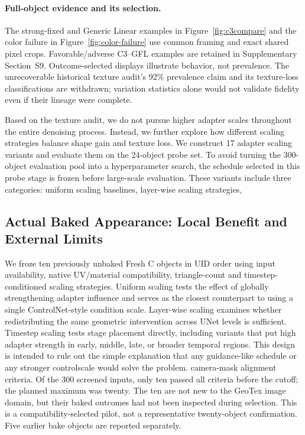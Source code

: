 \documentclass[times,twocolumn,final]{elsarticle}
\providecommand{\DIFadd}[1]{{\protect\color{blue} \sf #1}} %
\providecommand{\DIFdel}[1]{{\protect\color{red} \scriptsize #1}} %
\providecommand{\DIFaddbegin}{} %
\providecommand{\DIFaddend}{} %
\providecommand{\DIFdelbegin}{} %
\providecommand{\DIFdelend}{} %
\begin{document}
\DIFdelbegin %
\DIFdelend \DIFaddbegin \paragraph{Full-object evidence and its selection.}
\DIFadd{The strong-fixed and Generic Linear examples in Figure~\ref{fig:c3compare} and the color failure in Figure~\ref{fig:color-failure} use common framing and exact shared pixel crops. Favorable/adverse C3--GFL examples are retained in Supplementary Section~S9. Outcome-selected displays illustrate behavior, not prevalence. The unrecoverable historical texture audit's 92\% prevalence claim and its texture-loss classifications are withdrawn; variation statistics alone would not validate fidelity even if their lineage were complete.
}\DIFaddend 


\DIFdelbegin \DIFdel{Based on the texture audit, we do not pursue higher adapter scales throughout the entire denoising process. Instead, we further explore how different scaling strategies balance shape gain and texture loss. We construct 17 adapter scaling variants and evaluate them on the 24-object probe set. To avoid turning the 300-object evaluation pool into a hyperparameter search, the schedule selected in this probe stage is frozen before large-scale evaluation. These variants include three categories: uniform scaling baselines, layer-wise scaling strategies, }\DIFdelend \DIFaddbegin \subsection{Actual Baked Appearance: Local Benefit and External Limits}
\label{subsec:new-bake}
\DIFadd{We froze ten previously unbaked Fresh C objects in UID order using input availability, native UV/material compatibility, triangle-count }\DIFaddend and \DIFdelbegin \DIFdel{timestep-conditioned scaling strategies.
Uniform scaling tests the effect of globally strengthening adapter influence and serves as the closest counterpart to using a single ControlNet-style condition scale. Layer-wise scaling examines whether redistributing the same geometric intervention across UNet levels is sufficient. Timestep scaling tests stage placement directly, including variants that put high adapter strength in early, middle, late, or broader temporal regions. This design is intended to rule out the simple explanation that any guidance-like schedule or any stronger controlscale would solve the problem. }\DIFdelend \DIFaddbegin \DIFadd{camera-mask alignment criteria. Of the 300 screened inputs, only ten passed all criteria before the cutoff; the planned maximum was twenty. The ten are not new to the GeoTex image domain, but their baked outcomes had not been inspected during selection. This is a compatibility-selected pilot, not a representative twenty-object confirmation. Five earlier bake objects are reported separately.
}\DIFaddend 
\end{document}
